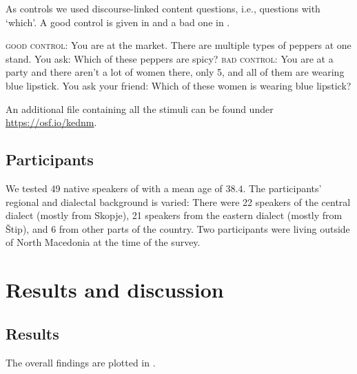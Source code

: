 \documentclass[output=paper]{langscibook}
\begin{document}
\begin{sloppypar}\noindent As controls we used discourse-linked content questions, i.e., questions with `which'. A good control is given in  and a bad one in .\end{sloppypar}


\eanoraggedright
\eanoraggedright \textsc{good control:} You are at the market. There are multiple types of peppers at one stand. You ask: Which of these peppers are spicy? \label{good}
\ex \textsc{bad control:} {You are at a party and there aren’t a lot of women there, only 5, and all of them are wearing blue lipstick. You ask your friend: Which of these women is wearing blue lipstick?} \label{bad}
\z\z

\noindent An additional file containing all the stimuli can be found under \url{https://osf.io/kednm}.


  \subsection{Participants}\label{sec:methodp}

We tested 49 native speakers of  with a mean age of $38.4$. The participants' regional and dialectal background is varied: There were 22 speakers of the central dialect (mostly from Skopje), 21 speakers from the eastern dialect (mostly from Štip), and 6 from other parts of the country. Two participants were living outside of North Macedonia at the time of the survey.


\section{Results and discussion}\label{sec:results}

\subsection{Results}
The overall findings are plotted in .
\end{document}
